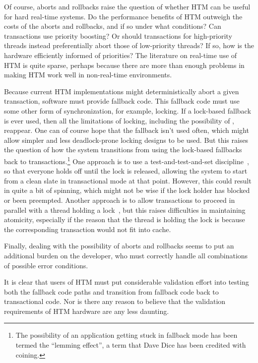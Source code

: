 Of course, aborts and rollbacks raise the question of whether HTM can
be useful for hard real-time systems.
Do the performance benefits of HTM outweigh the costs of the aborts
and rollbacks, and if so under what conditions?
Can transactions use priority boosting?
Or should transactions for high-priority threads instead preferentially
abort those of low-priority threads?
If so, how is the hardware efficiently informed of priorities?
The literature on real-time use of HTM is quite sparse, perhaps
because there are more than enough problems in making HTM work well in
non-real-time environments.

Because current HTM implementations might deterministically abort a
given transaction, software must provide fallback code.
This fallback code must use some other form of synchronization, for
example, locking.
If a lock-based fallback is ever used, then all the limitations of locking,
including the possibility of , reappear.
One can of course hope that the fallback isn't used often, which might
allow simpler and less deadlock-prone locking designs to be used.
But this raises the question of how the system transitions from using
the lock-based fallbacks back to transactions.\footnote{
	The possibility of an application getting stuck in fallback
	mode has been termed the ``lemming effect'', a term that
	Dave Dice has been credited with coining.}
One approach is to use a test-and-test-and-set discipline~\cite{Martinez02a},
so that everyone holds off until the lock is released, allowing the
system to start from a clean slate in transactional mode at that point.
However, this could result in quite a bit of spinning, which might not
be wise if the lock holder has blocked or been preempted.
Another approach is to allow transactions to proceed in parallel with
a thread holding a lock~\cite{Martinez02a}, but this raises difficulties
in maintaining atomicity, especially if the reason that the thread is
holding the lock is because the corresponding transaction would not fit
into cache.

Finally, dealing with the possibility of aborts and rollbacks seems to
put an additional burden on the developer, who must correctly handle
all combinations of possible error conditions.

It is clear that users of HTM must put considerable validation effort
into testing both the fallback code paths and transition from fallback
code back to transactional code.
Nor is there any reason to believe that the validation requirements of
HTM hardware are any less daunting.

